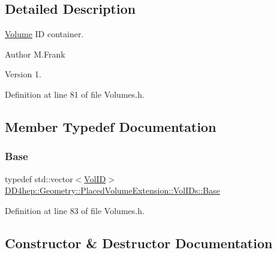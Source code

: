 \subsection{Detailed Description}
\hyperlink{class_d_d4hep_1_1_geometry_1_1_volume}{Volume} ID container. 

\begin{DoxyAuthor}{Author}
M.\+Frank 
\end{DoxyAuthor}
\begin{DoxyVersion}{Version}
1. 
\end{DoxyVersion}


Definition at line 81 of file Volumes.\+h.



\subsection{Member Typedef Documentation}
\hypertarget{class_d_d4hep_1_1_geometry_1_1_placed_volume_extension_1_1_vol_i_ds_a9328d0964ef092fd108679b2ecafd5b7}{}\label{class_d_d4hep_1_1_geometry_1_1_placed_volume_extension_1_1_vol_i_ds_a9328d0964ef092fd108679b2ecafd5b7} 
\subsubsection{\texorpdfstring{Base}{Base}}
{\footnotesize\ttfamily typedef std\+::vector$<$\hyperlink{class_d_d4hep_1_1_geometry_1_1_placed_volume_extension_a9f0e95dedfbda206b118af985b2ed473}{Vol\+ID}$>$ \hyperlink{class_d_d4hep_1_1_geometry_1_1_placed_volume_extension_1_1_vol_i_ds_a9328d0964ef092fd108679b2ecafd5b7}{D\+D4hep\+::\+Geometry\+::\+Placed\+Volume\+Extension\+::\+Vol\+I\+Ds\+::\+Base}}



Definition at line 83 of file Volumes.\+h.



\subsection{Constructor \& Destructor Documentation}
\hypertarget{class_d_d4hep_1_1_geometry_1_1_placed_volume_extension_1_1_vol_i_ds_a83ca12f7cd6c231504251ce741295f64}{}\label{class_d_d4hep_1_1_geometry_1_1_placed_volume_extension_1_1_vol_i_ds_a83ca12f7cd6c231504251ce741295f64} 
